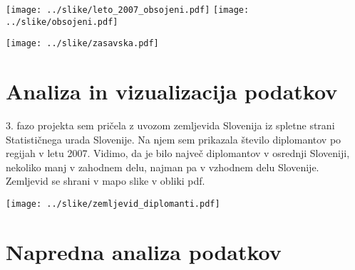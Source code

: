 \documentclass[11pt,a4paper]{article}
\begin{document}
\texttt{[image: ../slike/leto\_2007\_obsojeni.pdf]}
\texttt{[image: ../slike/obsojeni.pdf]}

\texttt{[image: ../slike/zasavska.pdf]}



\section{Analiza in vizualizacija podatkov}
3. fazo projekta sem pričela z uvozom zemljevida Slovenija iz spletne strani Statističnega urada Slovenije. Na njem sem prikazala število diplomantov po regijah v letu 2007. Vidimo, da je bilo največ diplomantov v osrednji Sloveniji, nekoliko manj v zahodnem delu, najman pa v vzhodnem delu Slovenije. Zemljevid se shrani v mapo slike v obliki pdf.

\texttt{[image: ../slike/zemljevid\_diplomanti.pdf]}





\section{Napredna analiza podatkov}

\end{document}
